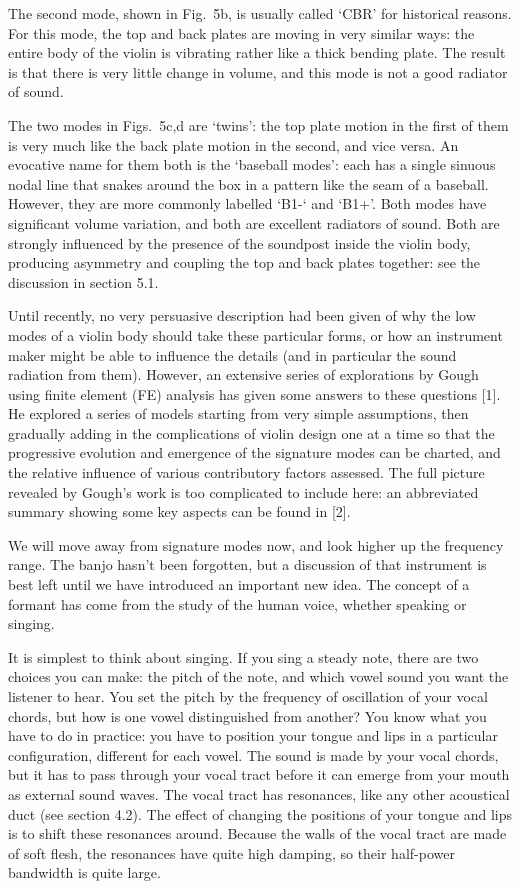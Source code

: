   The second mode, shown in Fig.\ 5b, is usually called `CBR' for historical 
  reasons. For this mode, the top and back plates are moving in very similar 
  ways: the entire body of the violin is vibrating rather like a thick bending 
  plate. The result is that there is very little change in volume, and this 
  mode is not a good radiator of sound. 

  The two modes in Figs.\ 5c,d are `twins': the top plate motion in the first 
  of them is very much like the back plate motion in the second, and vice 
  versa. An evocative name for them both is the `baseball modes': each has a 
  single sinuous nodal line that snakes around the box in a pattern like the 
  seam of a baseball. However, they are more commonly labelled `B1-` and `B1+'. 
  Both modes have significant volume variation, and both are excellent 
  radiators of sound. Both are strongly influenced by the presence of the 
  soundpost inside the violin body, producing asymmetry and coupling the top 
  and back plates together: see the discussion in section 5.1. 

  Until recently, no very persuasive description had been given of why the low 
  modes of a violin body should take these particular forms, or how an 
  instrument maker might be able to influence the details (and in particular 
  the sound radiation from them). However, an extensive series of explorations 
  by Gough using finite element (FE) analysis has given some answers to these 
  questions [1]. He explored a series of models starting from very simple 
  assumptions, then gradually adding in the complications of violin design one 
  at a time so that the progressive evolution and emergence of the signature 
  modes can be charted, and the relative influence of various contributory 
  factors assessed. The full picture revealed by Gough’s work is too 
  complicated to include here: an abbreviated summary showing some key aspects 
  can be found in [2]. 

  We will move away from signature modes now, and look higher up the frequency 
  range. The banjo hasn't been forgotten, but a discussion of that instrument 
  is best left until we have introduced an important new idea. The concept of a 
  formant has come from the study of the human voice, whether speaking or 
  singing. 

  It is simplest to think about singing. If you sing a steady note, there are 
  two choices you can make: the pitch of the note, and which vowel sound you 
  want the listener to hear. You set the pitch by the frequency of oscillation 
  of your vocal chords, but how is one vowel distinguished from another? You 
  know what you have to do in practice: you have to position your tongue and 
  lips in a particular configuration, different for each vowel. The sound is 
  made by your vocal chords, but it has to pass through your vocal tract before 
  it can emerge from your mouth as external sound waves. The vocal tract has 
  resonances, like any other acoustical duct (see section 4.2). The effect of 
  changing the positions of your tongue and lips is to shift these resonances 
  around. Because the walls of the vocal tract are made of soft flesh, the 
  resonances have quite high damping, so their half-power bandwidth is quite 
  large. 

